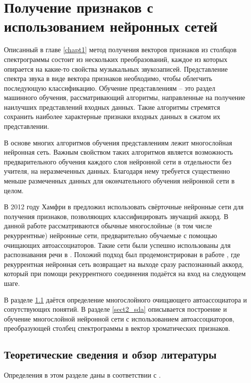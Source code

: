 \chapter{Получение признаков с использованием нейронных сетей}
\label{chapt2}

Описанный в главе \ref{chapt1} метод получения векторов признаков из столбцов
спектрограммы состоит из нескольких преобразований, каждое из которых опирается
на какие-то свойства музыкальных звукозаписей. Представление спектра звука в
виде вектора признаков необходимо, чтобы облегчить последующую классификацию.
Обучение представлениям -- это раздел машинного обучения, рассматривающий
алгоритмы, направленные на получение наилучших представлений входных данных.
Такие алгоритмы стремятся сохранить наиболее характерные признаки входных данных
в сжатом их представлении.

В основе многих алгоритмов обучения представлениям лежит многослойная нейронная
сеть. Важным свойством таких алгоритмов является возможность предварительного
обучения каждого слоя нейронной сети в отдельности без учителя, на неразмеченных
данных. Благодаря нему требуется существенно меньше размеченных данных для
окончательного обучения нейронной сети в целом.

В 2012 году Хамфри в \cite{Humphrey2012} предложил использовать свёрточные
нейронные сети для получения признаков, позволяющих классифицировать звучащий
аккорд. В данной работе рассматриваются обычные многослойные (в том числе
рекуррентные) нейронные сети, предварительно обучаемые с помощью очищающих
автоассоциаторов. Такие сети были успешно использованы для распознавания речи в
\cite{Maas2012}. Похожий подход был продемонстрирован в работе
\cite{BoulangerLewandowski2013}, где рекуррентная нейронная сеть возвращает на
выходе сразу распознанный аккорд, который при помощи рекуррентного соединения
подаётся на вход на следующем шаге.

В разделе \ref{sect2_theory} даётся определение многослойного очищающего
автоассоциатора и сопутствующих понятий. В разделе \ref{sect2_sda} описывается
построение и обучение многослойной нейронной сети с использованием
автоассоциаторов, преобразующей столбец спектрограммы в вектор хроматических
признаков.

\section{Теоретические сведения и обзор литературы} \label{sect2_theory}

Определения в этом разделе даны в соответствии с \cite{Vincent2010}.

